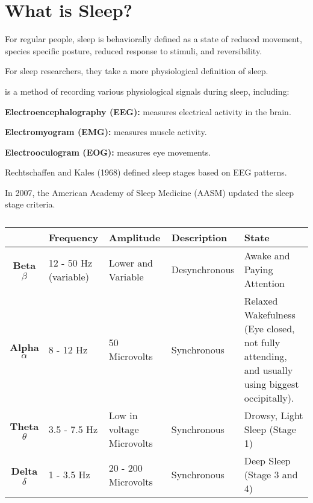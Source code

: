 \section{What is Sleep?}

\begin{coloredlist}
    \item For regular people, sleep is behaviorally defined as a state of reduced movement, species specific posture, reduced response to stimuli, and reversibility.
    \item For sleep researchers, they take a more physiological definition of sleep.
    \begin{coloredlist}
        \item {} is a method of recording various physiological signals during sleep, including:
        \begin{coloredlist}
            \item \textbf{Electroencephalography (EEG):} measures electrical activity in the brain.
            \item \textbf{Electromyogram (EMG):} measures muscle activity.
            \item \textbf{Electrooculogram (EOG):} measures eye movements.
            \item Rechtschaffen and Kales (1968) defined sleep stages based on EEG patterns.
            \item In 2007, the American Academy of Sleep Medicine (AASM) updated the sleep stage criteria.
        \end{coloredlist}
    \end{coloredlist}
\end{coloredlist}

\begin{table}[htbp]
    \centering
    \begin{tabular}{cp{2cm}p{2.5cm}p{3cm}p{4cm}}
        \toprule
         & \textbf{Frequency} & \textbf{Amplitude} & \textbf{Description} & \textbf{State} \\ \midrule
        \textbf{Beta \(\beta\)} & 12 - 50 Hz (variable) & Lower and Variable & Desynchronous & Awake and Paying Attention \\ \midrule
        \textbf{Alpha \(\alpha\)} & 8 - 12 Hz & 50 Microvolts & Synchronous & Relaxed Wakefulness (Eye closed, not fully attending, and usually using biggest occipitally). \\ \midrule
        \textbf{Theta \(\theta\)} & 3.5 - 7.5 Hz & Low in voltage Microvolts & Synchronous & Drowsy, Light Sleep (Stage 1) \\ \midrule
        \textbf{Delta \(\delta\)} & 1 - 3.5 Hz & 20 - 200 Microvolts & Synchronous & Deep Sleep (Stage 3 and 4) \\
        \bottomrule
    \end{tabular}
    \caption{}\label{tab:}
\end{table}
